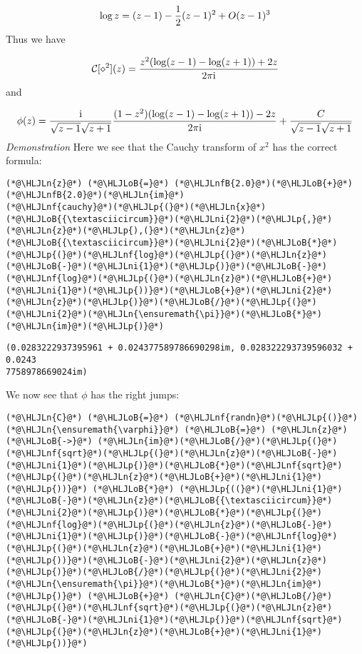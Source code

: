 \documentclass[12pt,landscape]{article}
\newcommand{\HLJLn}[1]{#1}
\newcommand{\HLJLnf}[1]{\textcolor[RGB]{66,102,213}{#1}}
\newcommand{\HLJLnfB}[1]{\textcolor[RGB]{59,151,46}{#1}}
\newcommand{\HLJLni}[1]{\textcolor[RGB]{59,151,46}{#1}}
\newcommand{\HLJLoB}[1]{\textcolor[RGB]{102,102,102}{\textbf{#1}}}
\newcommand{\HLJLp}[1]{#1}
\def\I{ {\rm i} }
\def\CC{ {\cal C} }
\begin{document}
{\[
\log z = (z-1) - {1\over 2}(z-1)^2 + O(z-1)^3
\]
Thus we have

\[
\CC[\diamond^2](z) = {z^2 (\log(z-1) - \log(z+1)) + 2 z \over 2 \pi \I}
\]
and

\[
\phi(z) = {\I \over \sqrt{z - 1} \sqrt{z+1}} {(1-z^2)(\log(z-1) - \log(z+1)) - 2 z \over 2 \pi \I}  + {C \over \sqrt{z-1}\sqrt{z+1}}
\]
\emph{Demonstration} Here we see that the Cauchy transform of $x^2$ has the correct formula:


\begin{lstlisting}
(*@\HLJLn{z}@*) (*@\HLJLoB{=}@*) (*@\HLJLnfB{2.0}@*)(*@\HLJLoB{+}@*)(*@\HLJLnfB{2.0}@*)(*@\HLJLn{im}@*)
(*@\HLJLnf{cauchy}@*)(*@\HLJLp{(}@*)(*@\HLJLn{x}@*)(*@\HLJLoB{{\textasciicircum}}@*)(*@\HLJLni{2}@*)(*@\HLJLp{,}@*) (*@\HLJLn{z}@*)(*@\HLJLp{),(}@*)(*@\HLJLn{z}@*)(*@\HLJLoB{{\textasciicircum}}@*)(*@\HLJLni{2}@*)(*@\HLJLoB{*}@*)(*@\HLJLp{(}@*)(*@\HLJLnf{log}@*)(*@\HLJLp{(}@*)(*@\HLJLn{z}@*)(*@\HLJLoB{-}@*)(*@\HLJLni{1}@*)(*@\HLJLp{)}@*)(*@\HLJLoB{-}@*)(*@\HLJLnf{log}@*)(*@\HLJLp{(}@*)(*@\HLJLn{z}@*)(*@\HLJLoB{+}@*)(*@\HLJLni{1}@*)(*@\HLJLp{))}@*)(*@\HLJLoB{+}@*)(*@\HLJLni{2}@*)(*@\HLJLn{z}@*)(*@\HLJLp{)}@*)(*@\HLJLoB{/}@*)(*@\HLJLp{(}@*)(*@\HLJLni{2}@*)(*@\HLJLn{\ensuremath{\pi}}@*)(*@\HLJLoB{*}@*)(*@\HLJLn{im}@*)(*@\HLJLp{)}@*)
\end{lstlisting}

\begin{lstlisting}
(0.0283222937395961 + 0.024377589786690298im, 0.028322293739596032 + 0.0243
7758978669024im)
\end{lstlisting}


We now see that $\phi$ has the right jumps:


\begin{lstlisting}
(*@\HLJLn{C}@*) (*@\HLJLoB{=}@*) (*@\HLJLnf{randn}@*)(*@\HLJLp{()}@*)
(*@\HLJLn{\ensuremath{\varphi}}@*) (*@\HLJLoB{=}@*) (*@\HLJLn{z}@*) (*@\HLJLoB{->}@*) (*@\HLJLn{im}@*)(*@\HLJLoB{/}@*)(*@\HLJLp{(}@*)(*@\HLJLnf{sqrt}@*)(*@\HLJLp{(}@*)(*@\HLJLn{z}@*)(*@\HLJLoB{-}@*)(*@\HLJLni{1}@*)(*@\HLJLp{)}@*)(*@\HLJLoB{*}@*)(*@\HLJLnf{sqrt}@*)(*@\HLJLp{(}@*)(*@\HLJLn{z}@*)(*@\HLJLoB{+}@*)(*@\HLJLni{1}@*)(*@\HLJLp{))}@*) (*@\HLJLoB{*}@*) (*@\HLJLp{((}@*)(*@\HLJLni{1}@*)(*@\HLJLoB{-}@*)(*@\HLJLn{z}@*)(*@\HLJLoB{{\textasciicircum}}@*)(*@\HLJLni{2}@*)(*@\HLJLp{)}@*)(*@\HLJLoB{*}@*)(*@\HLJLp{(}@*)(*@\HLJLnf{log}@*)(*@\HLJLp{(}@*)(*@\HLJLn{z}@*)(*@\HLJLoB{-}@*)(*@\HLJLni{1}@*)(*@\HLJLp{)}@*)(*@\HLJLoB{-}@*)(*@\HLJLnf{log}@*)(*@\HLJLp{(}@*)(*@\HLJLn{z}@*)(*@\HLJLoB{+}@*)(*@\HLJLni{1}@*)(*@\HLJLp{))}@*)(*@\HLJLoB{-}@*)(*@\HLJLni{2}@*)(*@\HLJLn{z}@*)(*@\HLJLp{)}@*)(*@\HLJLoB{/}@*)(*@\HLJLp{(}@*)(*@\HLJLni{2}@*)(*@\HLJLn{\ensuremath{\pi}}@*)(*@\HLJLoB{*}@*)(*@\HLJLn{im}@*)(*@\HLJLp{)}@*) (*@\HLJLoB{+}@*) (*@\HLJLn{C}@*)(*@\HLJLoB{/}@*)(*@\HLJLp{(}@*)(*@\HLJLnf{sqrt}@*)(*@\HLJLp{(}@*)(*@\HLJLn{z}@*)(*@\HLJLoB{-}@*)(*@\HLJLni{1}@*)(*@\HLJLp{)}@*)(*@\HLJLnf{sqrt}@*)(*@\HLJLp{(}@*)(*@\HLJLn{z}@*)(*@\HLJLoB{+}@*)(*@\HLJLni{1}@*)(*@\HLJLp{))}@*)


\end{lstlisting}}
\end{document}
